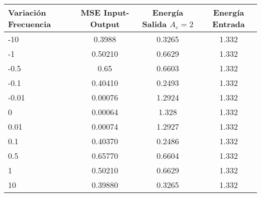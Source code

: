 \begin{table}[H]
	\centering
	\caption{\scriptsize}
	\label{tab:variacionFrecuencia2}
	\vspace{-3mm}
	\tiny\begin{tabular}{|l|c|c|c|}
		\hline
		{Variación Frecuencia} & {MSE Input-Output} & {Energía Salida $A_c=2$} & {Energía Entrada} \\ \hline
		{-10}                  & 0.3988             & 0.3265                   & 1.332             \\ \hline
		{-1}                   & 0.50210            & 0.6629                   & 1.332             \\ \hline
		{-0.5}                 & 0.65               & 0.6603                   & 1.332             \\ \hline
		{-0.1}                 & 0.40410            & 0.2493                   & 1.332             \\ \hline
		{-0.01}                & 0.00076            & 1.2924                   & 1.332             \\ \hline
		{0}                    & 0.00064            & 1.328                    & 1.332             \\ \hline
		{0.01}                 & 0.00074            & 1.2927                   & 1.332             \\ \hline
		{0.1}                  & 0.40370            & 0.2486                   & 1.332             \\ \hline
		{0.5}                  & 0.65770            & 0.6604                   & 1.332             \\ \hline
		{1}                    & 0.50210            & 0.6629                   & 1.332             \\ \hline
		{10}                   & 0.39880            & 0.3265                   & 1.332             \\ \hline
	\end{tabular}
\end{table}
